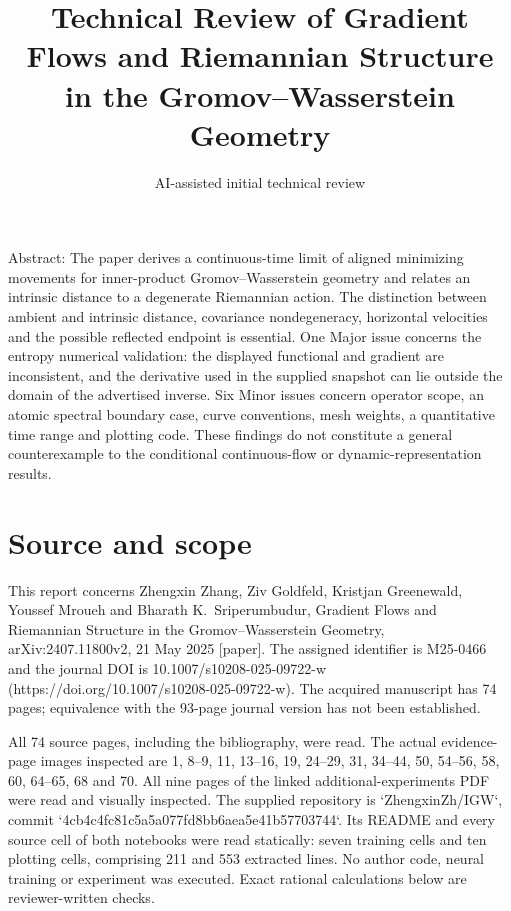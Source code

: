 \documentclass[10pt]{article}
\title{Technical Review of
Gradient Flows and Riemannian Structure in the Gromov–Wasserstein Geometry}
\author{AI-assisted initial technical review}
\date{}
\begin{document}
\maketitle
Abstract: The paper derives a continuous-time limit of aligned minimizing movements for inner-product Gromov–Wasserstein geometry and relates an intrinsic distance to a degenerate Riemannian action. The distinction between ambient and intrinsic distance, covariance nondegeneracy, horizontal velocities and the possible reflected endpoint is essential. One Major issue concerns the entropy numerical validation: the displayed functional and gradient are inconsistent, and the derivative used in the supplied snapshot can lie outside the domain of the advertised inverse. Six Minor issues concern operator scope, an atomic spectral boundary case, curve conventions, mesh weights, a quantitative time range and plotting code. These findings do not constitute a general counterexample to the conditional continuous-flow or dynamic-representation results.\par
\section*{Source and scope}
This report concerns Zhengxin Zhang, Ziv Goldfeld, Kristjan Greenewald, Youssef Mroueh and Bharath K. Sriperumbudur, Gradient Flows and Riemannian Structure in the Gromov–Wasserstein Geometry, arXiv:2407.11800v2, 21 May 2025 [paper]. The assigned identifier is M25-0466 and the journal DOI is 10.1007/s10208-025-09722-w (https://doi.org/10.1007/s10208-025-09722-w). The acquired manuscript has 74 pages; equivalence with the 93-page journal version has not been established.\par
All 74 source pages, including the bibliography, were read. The actual evidence-page images inspected are 1, 8–9, 11, 13–16, 19, 24–29, 31, 34–44, 50, 54–56, 58, 60, 64–65, 68 and 70. All nine pages of the linked additional-experiments PDF were read and visually inspected. The supplied repository is `ZhengxinZh/IGW`, commit `4cb4c4fc81c5a5a077fd8bb6aea5e41b57703744`. Its README and every source cell of both notebooks were read statically: seven training cells and ten plotting cells, comprising 211 and 553 extracted lines. No author code, neural training or experiment was executed. Exact rational calculations below are reviewer-written checks.\par
\end{document}
